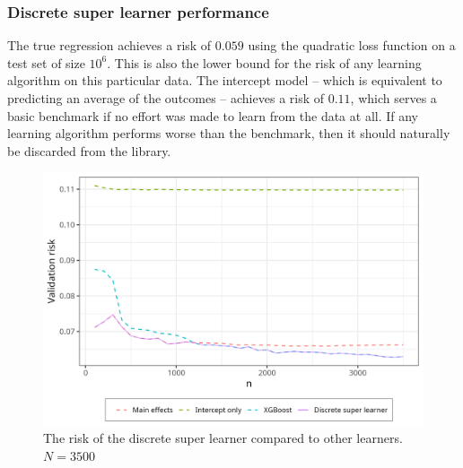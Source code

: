 \documentclass[./main.tex]{subfiles}
\begin{document}
\subsubsection{Discrete super learner performance}
The true regression achieves a risk of $ 0.059 $ using the quadratic loss function on a test set of size $ 10^{6} $. This is also the lower bound for the risk of any learning algorithm on this particular data. The intercept model -- which is equivalent to predicting an average of the outcomes -- achieves a risk of $ 0.11 $, which serves a basic benchmark if no effort was made to learn from the data at all. If any learning algorithm performs worse than the benchmark, then it should naturally be discarded from the library.  
\begin{figure}[H]
    \centering
    \includegraphics[width=\textwidth]{figures/dsl_loss.png}
    \caption{The risk of the discrete super learner compared to other learners. $ N = 3500 $} 
    \label{fig:loss_min_of_both}
\end{figure}
\end{document}
